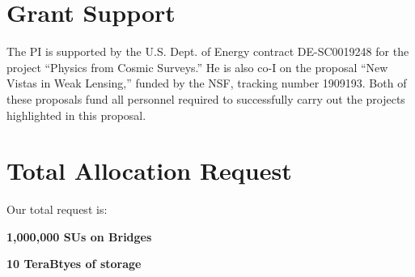 \documentclass[12pt]{article}
\begin{document}
\begin{small}
\section{Grant Support}

The PI is supported by the U.S. Dept. of Energy contract DE-SC0019248 for the project ``Physics from Cosmic Surveys.'' He is also co-I on the proposal ``New Vistas in Weak Lensing,'' funded by the NSF, tracking number 1909193. Both of these proposals fund all personnel required to successfully carry out the projects highlighted in this proposal.

\section{Total Allocation Request}

Our total request is:

{\bf 1,000,000 SUs on Bridges}

{\bf 10 TeraBtyes of storage}

\end{small}




\end{document}
